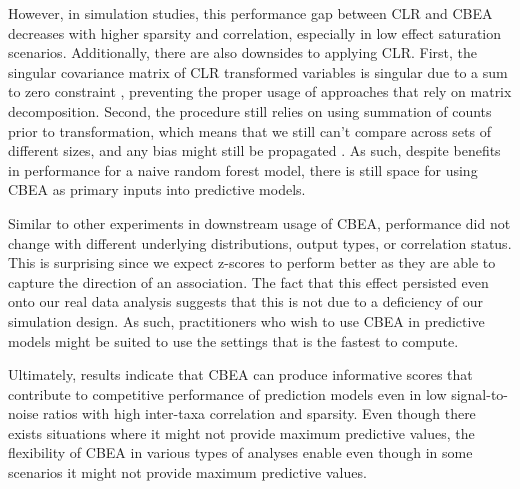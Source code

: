 \documentclass[10pt,letterpaper]{article}
\begin{document}
However, in simulation studies, this performance gap between CLR and CBEA decreases with higher sparsity and correlation, especially in low effect saturation scenarios. Additionally, there are also downsides to applying CLR. First, the singular covariance matrix of CLR transformed variables is singular due to a sum to zero constraint \cite{gloor2017}, preventing the proper usage of approaches that rely on matrix decomposition. Second, the procedure still relies on using summation of counts prior to transformation, which means that we still can't compare across sets of different sizes, and any bias might still be propagated \cite{mclaren2019}. As such, despite benefits in performance for a naive random forest model, there is still space for using CBEA as primary inputs into predictive models. 

Similar to other experiments in downstream usage of CBEA, performance did not change with different underlying distributions, output types, or correlation status. This is surprising since we expect z-scores to perform better as they are able to capture the direction of an association. The fact that this effect persisted even onto our real data analysis suggests that this is not due to a deficiency of our simulation design. As such, practitioners who wish to use CBEA in predictive models might be suited to use the settings that is the fastest to compute.  

Ultimately, results indicate that CBEA can produce informative scores that contribute to competitive performance of prediction models even in low signal-to-noise ratios with high inter-taxa correlation and sparsity. Even though there exists situations where it might not provide maximum predictive values, the flexibility of CBEA in various types of analyses enable even though in some scenarios it might not provide maximum predictive values. 
\end{document}
